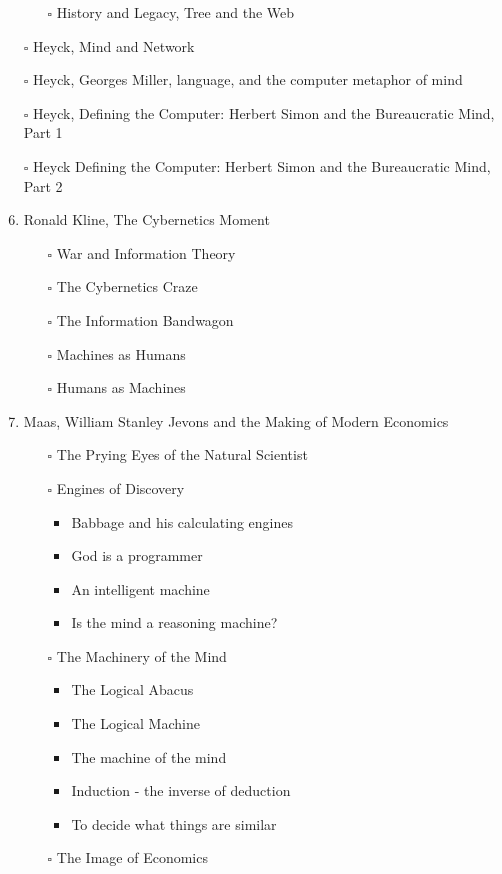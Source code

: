\documentclass[paper=B6,portrait,twoside=true,twocolumn=false,headinclude=true,footinclude=false,fontsize=12,BCOR=10mm,DIV=calc,pagesize=auto,titlepage=firstiscover,mpinclude=false,headings=normal,headings=twolinechapter,open=right,toc=graduated,chapterprefix=false,numbers=endperiod,parskip=half+]{scrbook}
\theoremstyle{definition}
\begin{document}
\begin{enumerate}
\begin{itemize}
\item[{$\square$}] History and Legacy, Tree and the Web
\end{itemize}
\item[{$\square$}] Heyck, Mind and Network
\item[{$\square$}] Heyck, Georges Miller, language, and the computer metaphor of mind
\item[{$\square$}] Heyck, Defining the Computer: Herbert Simon and the Bureaucratic Mind, Part 1
\item[{$\square$}] Heyck Defining the Computer: Herbert Simon and the Bureaucratic Mind, Part 2
\item\relax [0/5] Ronald Kline, The Cybernetics Moment
\begin{itemize}
\item[{$\square$}] War and Information Theory
\item[{$\square$}] The Cybernetics Craze
\item[{$\square$}] The Information Bandwagon
\item[{$\square$}] Machines as Humans
\item[{$\square$}] Humans as Machines
\end{itemize}
\item\relax [0/4] Maas, William Stanley Jevons and the Making of Modern Economics
\begin{itemize}
\item[{$\square$}] The Prying Eyes of the Natural Scientist
\item[{$\square$}] Engines of Discovery
\begin{itemize}
\item Babbage and his calculating engines
\item God is a programmer
\item An intelligent machine
\item Is the mind a reasoning machine?
\end{itemize}
\item[{$\square$}] The Machinery of the Mind
\begin{itemize}
\item The Logical Abacus
\item The Logical Machine
\item The machine of the mind
\item Induction - the inverse of deduction
\item To decide what things are similar
\end{itemize}
\item[{$\square$}] The Image of Economics

\end{itemize}
\end{enumerate}
\end{document}
